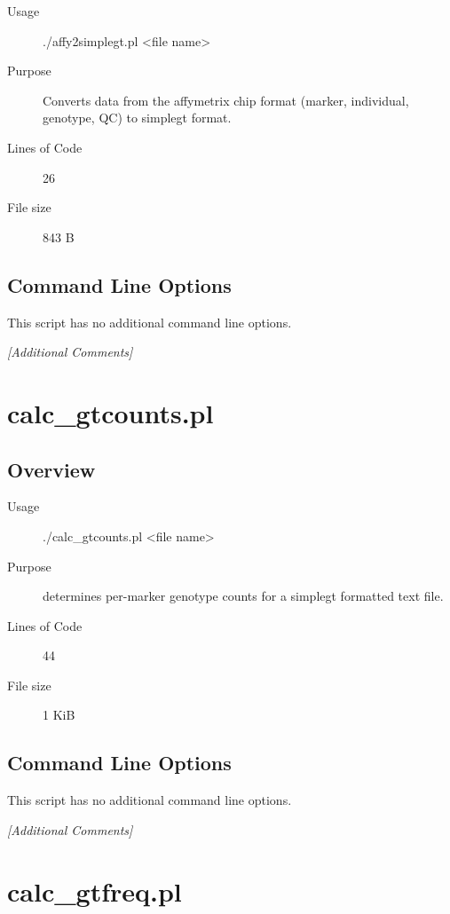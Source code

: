 \begin{description}
\item[Usage] ./affy2simplegt.pl <file name>
\item[Purpose] Converts data from the affymetrix chip format (marker, individual, genotype, QC) to simplegt format.
\item[Lines of Code] 26
\item[File size] 843 B
\end{description}

\subsection{Command Line Options}
\label{sec:affy2simplegt.pl-command-line}

This script has no additional command line options.

\emph{[Additional Comments]}

\section{calc_gtcounts.pl}
\label{sec:calc-gtcounts.pl}

\subsection{Overview}
\label{sec:calc-gtcounts.pl-overview}

\begin{description}
\item[Usage] ./calc_gtcounts.pl <file name>
\item[Purpose] determines per-marker genotype counts for a simplegt formatted text file.
\item[Lines of Code] 44
\item[File size] 1 KiB
\end{description}

\subsection{Command Line Options}
\label{sec:calc-gtcounts.pl-command-line}

This script has no additional command line options.

\emph{[Additional Comments]}

\section{calc_gtfreq.pl}
\label{sec:calc-gtfreq.pl}

